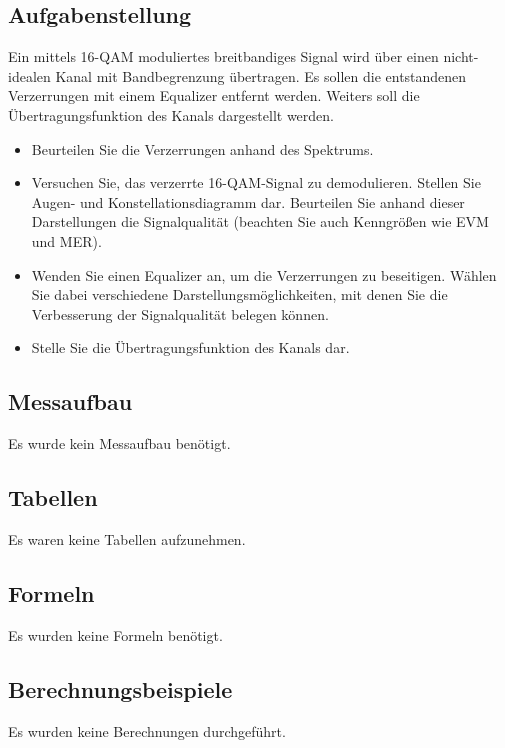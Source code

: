 \documentclass[12pt,a4paper,ngerman]{article}
\begin{document}
\subsection{Aufgabenstellung}
Ein mittels 16-QAM moduliertes breitbandiges Signal wird über einen nicht-idealen Kanal mit Bandbegrenzung übertragen. Es sollen die entstandenen Verzerrungen mit einem Equalizer entfernt werden. Weiters soll die Übertragungsfunktion des Kanals dargestellt werden. 
\begin{itemize}
\item Beurteilen Sie die Verzerrungen anhand des Spektrums.
\item Versuchen Sie, das verzerrte 16-QAM-Signal zu demodulieren. Stellen Sie Augen- und Konstellationsdiagramm dar. Beurteilen Sie anhand dieser Darstellungen die Signalqualität (beachten Sie auch Kenngrößen wie EVM und MER).
\item Wenden Sie einen Equalizer an, um die Verzerrungen zu beseitigen. Wählen Sie dabei verschiedene Darstellungsmöglichkeiten, mit denen Sie die Verbesserung der Signalqualität belegen können. 
\item Stelle Sie die Übertragungsfunktion des Kanals dar. 
\end{itemize}
\cite[18]{skript}

\subsection{Messaufbau}
Es wurde kein Messaufbau benötigt.
\subsection{Tabellen}
Es waren keine Tabellen aufzunehmen. 
\subsection{Formeln}
Es wurden keine Formeln benötigt.
\subsection{Berechnungsbeispiele}
Es wurden keine Berechnungen durchgeführt.

\pagebreak
\end{document}
